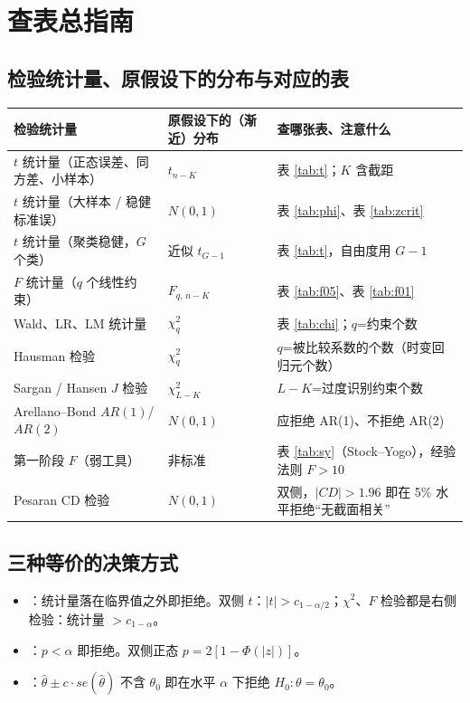 \ifqr
\section{查表总指南}
\subsection{检验统计量、原假设下的分布与对应的表}
\begin{center}\small
\begin{tabularx}{\linewidth}{>{\raggedright\arraybackslash}p{4.2cm}>{\raggedright\arraybackslash}p{3.6cm}L}
\toprule
检验统计量 & 原假设下的（渐近）分布 & 查哪张表、注意什么\\
\midrule
$t$ 统计量（正态误差、同方差、小样本） & $t_{n-K}$ & 表 \ref{tab:t}；$K$ 含截距\\
$t$ 统计量（大样本 / 稳健标准误） & $N(0,1)$ & 表 \ref{tab:phi}、表 \ref{tab:zcrit}\\
$t$ 统计量（聚类稳健，$G$ 个类） & 近似 $t_{G-1}$ & 表 \ref{tab:t}，自由度用 $G-1$\\
$F$ 统计量（$q$ 个线性约束） & $F_{q,\,n-K}$ & 表 \ref{tab:f05}、表 \ref{tab:f01}\\
Wald、LR、LM 统计量 & $\chi^2_q$ & 表 \ref{tab:chi}；$q$=约束个数\\
Hausman 检验 & $\chi^2_{q}$ & $q$=被比较系数的个数（时变回归元个数）\\
Sargan / Hansen $J$ 检验 & $\chi^2_{L-K}$ & $L-K$=过度识别约束个数\\
Arellano--Bond $AR(1)$/$AR(2)$ & $N(0,1)$ & 应拒绝 AR(1)、不拒绝 AR(2)\\
第一阶段 $F$（弱工具） & 非标准 & 表 \ref{tab:sy}（Stock--Yogo），经验法则 $F>10$\\
Pesaran CD 检验 & $N(0,1)$ & 双侧，$|CD|>1.96$ 即在 5\% 水平拒绝“无截面相关”\\
\bottomrule
\end{tabularx}\end{center}
\subsection{三种等价的决策方式}
\begin{itemize}
\item {}：统计量落在临界值之外即拒绝。双侧 $t$：$|t|>c_{1-\alpha/2}$；$\chi^2$、$F$ 检验都是右侧检验：统计量 $>c_{1-\alpha}$。
\item {}：$p<\alpha$ 即拒绝。双侧正态 $p=2[1-\Phi(|z|)]$。
\item {}：$\hat\theta\pm c\cdot se(\hat\theta)$ 不含 $\theta_0$ 即在水平 $\alpha$ 下拒绝 $H_0:\theta=\theta_0$。
\end{itemize}
